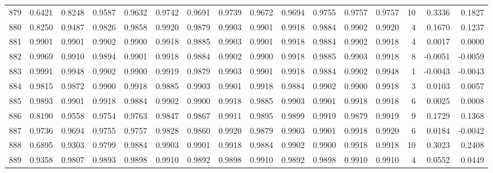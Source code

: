 \begin{tabular}{lrrrrrrrrrrrrrrr}
879 &      0.6421 &  0.8248 &  0.9587 &  0.9632 &  0.9742 &  0.9691 &  0.9739 &  0.9672 &  0.9694 &  0.9755 &   0.9757 &     0.9757 &     10 &                    0.3336 &                     0.1827 \\
880 &      0.8250 &  0.9487 &  0.9826 &  0.9858 &  0.9920 &  0.9879 &  0.9903 &  0.9901 &  0.9918 &  0.9884 &   0.9902 &     0.9920 &      4 &                    0.1670 &                     0.1237 \\
881 &      0.9901 &  0.9901 &  0.9902 &  0.9900 &  0.9918 &  0.9885 &  0.9903 &  0.9901 &  0.9918 &  0.9884 &   0.9902 &     0.9918 &      4 &                    0.0017 &                     0.0000 \\
882 &      0.9969 &  0.9910 &  0.9894 &  0.9901 &  0.9918 &  0.9884 &  0.9902 &  0.9900 &  0.9918 &  0.9885 &   0.9903 &     0.9918 &      8 &                   -0.0051 &                    -0.0059 \\
883 &      0.9991 &  0.9948 &  0.9902 &  0.9900 &  0.9919 &  0.9879 &  0.9903 &  0.9901 &  0.9918 &  0.9884 &   0.9902 &     0.9948 &      1 &                   -0.0043 &                    -0.0043 \\
884 &      0.9815 &  0.9872 &  0.9900 &  0.9918 &  0.9885 &  0.9903 &  0.9901 &  0.9918 &  0.9884 &  0.9902 &   0.9900 &     0.9918 &      3 &                    0.0103 &                     0.0057 \\
885 &      0.9893 &  0.9901 &  0.9918 &  0.9884 &  0.9902 &  0.9900 &  0.9918 &  0.9885 &  0.9903 &  0.9901 &   0.9918 &     0.9918 &      6 &                    0.0025 &                     0.0008 \\
886 &      0.8190 &  0.9558 &  0.9754 &  0.9763 &  0.9847 &  0.9867 &  0.9911 &  0.9895 &  0.9899 &  0.9919 &   0.9879 &     0.9919 &      9 &                    0.1729 &                     0.1368 \\
887 &      0.9736 &  0.9694 &  0.9755 &  0.9757 &  0.9828 &  0.9860 &  0.9920 &  0.9879 &  0.9903 &  0.9901 &   0.9918 &     0.9920 &      6 &                    0.0184 &                    -0.0042 \\
888 &      0.6895 &  0.9303 &  0.9799 &  0.9884 &  0.9903 &  0.9901 &  0.9918 &  0.9884 &  0.9902 &  0.9900 &   0.9918 &     0.9918 &     10 &                    0.3023 &                     0.2408 \\
889 &      0.9358 &  0.9807 &  0.9893 &  0.9898 &  0.9910 &  0.9892 &  0.9898 &  0.9910 &  0.9892 &  0.9898 &   0.9910 &     0.9910 &      4 &                    0.0552 &                     0.0449 \\

\end{tabular}
